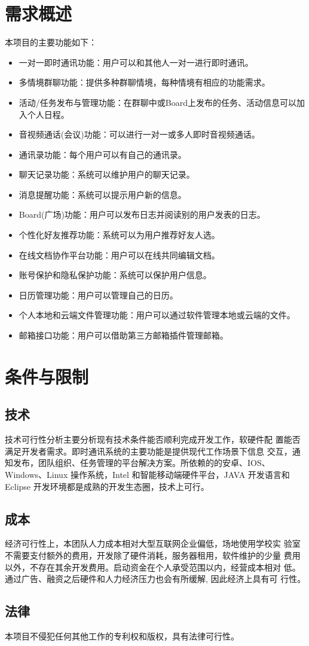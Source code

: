 \section{需求概述}
本项目的主要功能如下：
\begin{itemize}
	\item 一对一即时通讯功能：用户可以和其他人一对一进行即时通讯。
	\item 多情境群聊功能：提供多种群聊情境，每种情境有相应的功能需求。
	\item 活动/任务发布与管理功能：在群聊中或Board上发布的任务、活动信息可以加入个人日程。
	\item 音视频通话(会议)功能：可以进行一对一或多人即时音视频通话。
	\item 通讯录功能：每个用户可以有自己的通讯录。
	\item 聊天记录功能：系统可以维护用户的聊天记录。
	\item 消息提醒功能：系统可以提示用户新的信息。
	\item Board(广场)功能：用户可以发布日志并阅读别的用户发表的日志。
	\item 个性化好友推荐功能：系统可以为用户推荐好友人选。
	\item 在线文档协作平台功能：用户可以在线共同编辑文档。
	\item 账号保护和隐私保护功能：系统可以保护用户信息。
	\item 日历管理功能：用户可以管理自己的日历。
	\item 个人本地和云端文件管理功能：用户可以通过软件管理本地或云端的文件。
	\item 邮箱接口功能：用户可以借助第三方邮箱插件管理邮箱。
\end{itemize}
\section{条件与限制}
\subsection{技术}
技术可行性分析主要分析现有技术条件能否顺利完成开发工作，软硬件配
置能否满足开发者需求。即时通讯系统的主要功能是提供现代工作场景下信息
交互，通知发布，团队组织、任务管理的平台解决方案。所依赖的的安卓、IOS、
Windows、Linux 操作系统，Intel 和智能移动端硬件平台，JAVA 开发语言和 Eclipse
开发环境都是成熟的开发生态圈，技术上可行。
\subsection{成本}
经济可行性上，本团队人力成本相对大型互联网企业偏低，场地使用学校实
验室不需要支付额外的费用，开发除了硬件消耗，服务器租用，软件维护的少量
费用以外，不存在其余开发费用。启动资金在个人承受范围以内，经营成本相对
低。通过广告、融资之后硬件和人力经济压力也会有所缓解, 因此经济上具有可
行性。
\subsection{法律}
本项目不侵犯任何其他工作的专利权和版权，具有法律可行性。
